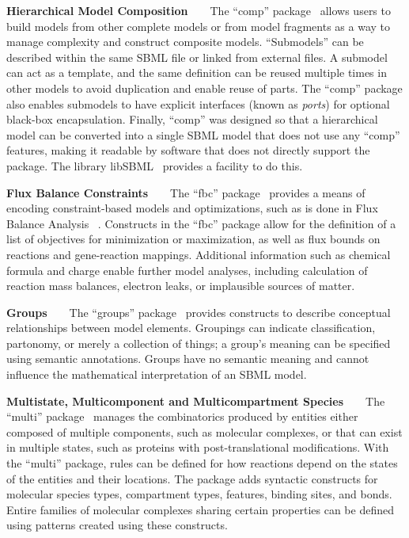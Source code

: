 \documentclass{sbml-paper}
\begin{document}
\textbf{Hierarchical Model Composition}~~~~The ``comp'' package~\citep{Smith2015} allows users to build models from other complete models or from model fragments as a way to manage complexity and construct composite models. ``Submodels'' can be described within the same SBML file or linked from external files. A submodel can act as a template, and the same definition can be reused multiple times in other models to avoid duplication and enable reuse of parts. The ``comp'' package also enables submodels to have explicit interfaces (known as \emph{ports}) for optional black-box encapsulation. Finally, ``comp'' was designed so that a hierarchical model can be converted into a single SBML model that does not use any ``comp'' features,  making it readable by software that does not directly support the package. The library libSBML~\citep{bornstein2008libsbml} provides a facility to do this.

\textbf{Flux Balance Constraints}~~~~The ``fbc'' package~\citep{Olivier2018a} provides a means of encoding constraint-based models and optimizations, such as is done in Flux Balance Analysis ~\citep{Bordbar2014a}. Constructs in the ``fbc'' package allow for the definition of a list of objectives for minimization or maximization, as well as flux bounds on reactions and gene-reaction mappings. Additional information such as chemical formula and charge enable further model analyses, including calculation of reaction mass balances, electron leaks, or implausible sources of matter.

\textbf{Groups}~~~~The ``groups'' package~\citep{hucka2016sbml} provides constructs to describe conceptual relationships between model elements. Groupings can indicate classification, partonomy, or merely a collection of things; a group's meaning can be specified using semantic annotations.  Groups have no semantic meaning and cannot influence the mathematical interpretation of an SBML model.

\textbf{Multistate, Multicomponent and Multicompartment Species}~~~~The ``multi'' package~\citep{zhang2018multi} manages the combinatorics produced by entities either composed of multiple components, such as molecular complexes, or that can exist in multiple states, such as proteins with post-translational modifications. With the ``multi'' package, rules can be defined for how reactions depend on the states of the entities and their locations. The package adds syntactic constructs for molecular species types, compartment types, features, binding sites, and bonds.  Entire families of molecular complexes sharing certain properties can be defined using patterns created using these constructs.
\end{document}
